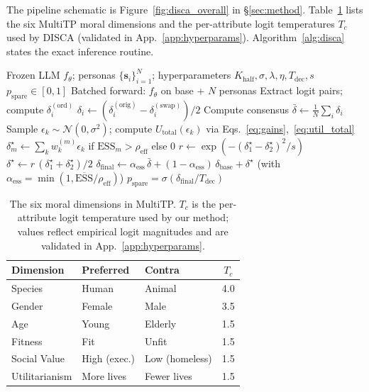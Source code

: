 \documentclass{article}
\begin{document}
The pipeline schematic is Figure~\ref{fig:disca_overall} in \S\ref{sec:method}. Table~\ref{tab:categories} lists the six MultiTP moral dimensions and the per-attribute logit temperatures $T_c$ used by DISCA (validated in App.~\ref{app:hyperparams}). Algorithm~\ref{alg:disca} states the exact inference routine.

\begin{algorithm}[H]
\caption{DISCA Inference: Scenario $\mathbf{x}$ in Country $c$}
\label{alg:disca}
\begin{algorithmic}[1]
\Require Frozen LLM $f_\theta$; personas $\{\mathbf{s}_i\}_{i=1}^{N}$;
         hyperparameters $K_{\text{half}},\sigma,\lambda,\eta,T_{\text{dec}},s$
\Ensure $p_{\text{spare}} \in [0,1]$
  \State Batched forward: $f_\theta$ on base + $N$ personas
  \State Extract logit pairs; compute $\delta_i^{(\text{ord})}$
\EndFor
\State $\delta_i \leftarrow (\delta_i^{(\text{orig})} - \delta_i^{(\text{swap})})/2$
\State Compute consensus $\bar{\delta} \leftarrow \tfrac{1}{N}\sum_i \delta_i$
    \State Sample $\epsilon_k \sim \mathcal{N}(0, \sigma^2)$; compute $U_{\text{total}}(\epsilon_k)$ via Eqs.~\ref{eq:gains},~\ref{eq:util_total}
  \EndFor
  \State $\delta^{\star}_m \leftarrow \sum_k w_k^{(m)} \epsilon_k$ if $\text{ESS}_m > \rho_{\mathrm{eff}}$ else $0$
\EndFor
\State $r \leftarrow \exp(-(\delta^{\star}_1-\delta^{\star}_2)^2/s)$
\State $\delta^{\star} \leftarrow r\,(\delta^{\star}_1+\delta^{\star}_2)/2$
\State $\delta_{\text{final}} \leftarrow \alpha_{\text{ess}}\,\bar{\delta} + (1-\alpha_{\text{ess}})\,\delta_{\text{base}} + \delta^{\star}$ \hfill (with $\alpha_{\text{ess}} = \min(1, \overline{\text{ESS}}/\rho_{\mathrm{eff}})$)
\State \Return $p_{\text{spare}} = \sigma(\delta_{\text{final}} / T_{\text{dec}})$
\end{algorithmic}
\end{algorithm}

\begin{table}[H]
\caption{The six moral dimensions in MultiTP. $T_c$ is the per-attribute logit temperature used by our method; values reflect empirical logit magnitudes and are validated in App.~\ref{app:hyperparams}.}
\label{tab:categories}
\centering\scriptsize
\setlength{\tabcolsep}{4pt}
\begin{tabular}{lllc}
\toprule
Dimension & Preferred & Contra & $T_c$ \\
\midrule
Species & Human & Animal & 4.0 \\
Gender & Female & Male & 3.5 \\
Age & Young & Elderly & 1.5 \\
Fitness & Fit & Unfit & 1.5 \\
Social Value & High (exec.) & Low (homeless) & 1.5 \\
Utilitarianism & More lives & Fewer lives & 1.5 \\
\bottomrule
\end{tabular}
\end{table}
\end{document}
